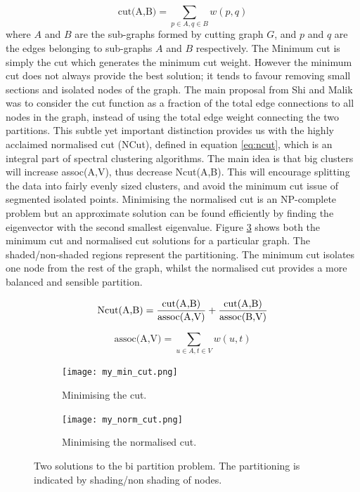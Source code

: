 \begin{equation}
  \text{cut(A,B)} = \sum_{p \in A, q \in B} w(p,q)
  \label{eq:cut}
\end{equation}
where $A$ and $B$ are the sub-graphs formed by cutting graph $G$, and $p$ and $q$ are the edges belonging to sub-graphs $A$ and $B$ respectively. 
The Minimum cut \citep{Wu1993} is simply the cut which generates the minimum cut weight. However the  minimum cut does not always provide the best solution; it tends to favour removing small sections and isolated nodes of the graph.  The main proposal from Shi and Malik was to consider the cut function as a fraction of the total edge connections to all nodes in the graph, instead of using the total edge weight connecting the two partitions. This subtle yet important distinction provides us with the highly acclaimed normalised cut (NCut), defined in equation \eqref{eq:ncut}, which is an integral part of spectral clustering algorithms. The main idea is that big clusters will increase assoc(A,V), thus decrease Ncut(A,B). This will encourage splitting the data into fairly evenly sized clusters, and avoid the minimum cut issue of segmented isolated points.  Minimising the normalised cut is an NP-complete problem but an approximate solution can be found efficiently by finding the eigenvector with the second smallest eigenvalue.  Figure \ref{fig:min_norm_cut} shows both the minimum cut and normalised cut solutions for a particular graph. The shaded/non-shaded regions represent the partitioning. The minimum cut isolates one node from the rest of the graph, whilst the normalised cut provides a more balanced and sensible partition. 
  
\begin{equation}
  \text{Ncut(A,B)} = \frac{\text{cut(A,B)}}{\text{assoc(A,V)}} + \frac{\text{cut(A,B)}}{\text{assoc(B,V)}} \\ 
    \label{eq:ncut}
\end{equation}

\begin{equation*}
  \text{assoc(A,V)} = \sum_{u \in A, t \in V}w(u, t) 
\end{equation*}

\begin{figure}[h!]
  \centering
  \begin{subfigure}{0.4\textwidth}
    \centering
    \texttt{[image: my\_min\_cut.png]}
    \caption{Minimising the cut.}
  \label{fig:min_cut}
  \end{subfigure}
  \begin{subfigure}{0.4\textwidth}
    \centering
    \texttt{[image: my\_norm\_cut.png]}
  \caption{Minimising the normalised cut.}
  \label{fig:norm_cut}
  \end{subfigure}

  \caption{Two solutions to the bi partition problem. The partitioning is indicated by shading/non shading of nodes.}
  \label{fig:min_norm_cut}
\end{figure}


